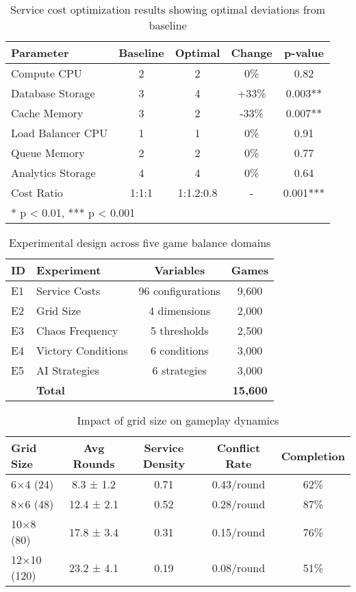 
\begin{table}[h]
\centering
\caption{Service cost optimization results showing optimal deviations from baseline}
\label{tab:costs}
\begin{tabular}{@{}lcccc@{}}
\toprule
Parameter & Baseline & Optimal & Change & p-value \\
\midrule
Compute CPU & 2 & 2 & 0\% & 0.82 \\
Database Storage & 3 & 4 & +33\% & 0.003** \\
Cache Memory & 3 & 2 & -33\% & 0.007** \\
Load Balancer CPU & 1 & 1 & 0\% & 0.91 \\
Queue Memory & 2 & 2 & 0\% & 0.77 \\
Analytics Storage & 4 & 4 & 0\% & 0.64 \\
\midrule
Cost Ratio & 1:1:1 & 1:1.2:0.8 & - & 0.001*** \\
\bottomrule
\multicolumn{5}{l}{\footnotesize ** p < 0.01, *** p < 0.001}
\end{tabular}
\end{table}

\begin{table}[h]
\centering
\caption{Experimental design across five game balance domains}
\label{tab:experiments}
\begin{tabular}{@{}llcc@{}}
\toprule
ID & Experiment & Variables & Games \\
\midrule
E1 & Service Costs & 96 configurations & 9,600 \\
E2 & Grid Size & 4 dimensions & 2,000 \\
E3 & Chaos Frequency & 5 thresholds & 2,500 \\
E4 & Victory Conditions & 6 conditions & 3,000 \\
E5 & AI Strategies & 6 strategies & 3,000 \\
\midrule
& \textbf{Total} & & \textbf{15,600} \\
\bottomrule
\end{tabular}
\end{table}

\begin{table}[h]
\centering
\caption{Impact of grid size on gameplay dynamics}
\label{tab:gridsize}
\begin{tabular}{@{}lcccc@{}}
\toprule
Grid Size & Avg Rounds & Service Density & Conflict Rate & Completion \\
\midrule
6×4 (24) & 8.3 ± 1.2 & 0.71 & 0.43/round & 62\% \\
8×6 (48) & 12.4 ± 2.1 & 0.52 & 0.28/round & 87\% \\
10×8 (80) & 17.8 ± 3.4 & 0.31 & 0.15/round & 76\% \\
12×10 (120) & 23.2 ± 4.1 & 0.19 & 0.08/round & 51\% \\
\bottomrule
\end{tabular}
\end{table}

